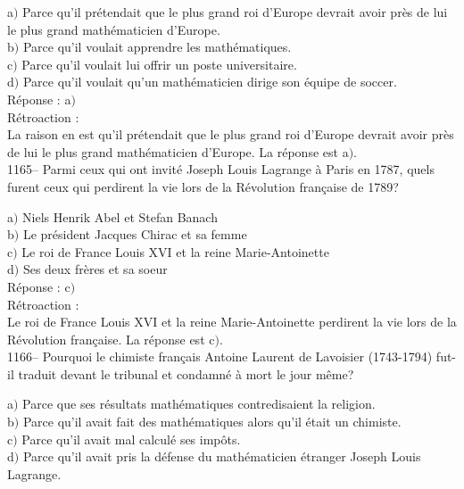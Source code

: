 ﻿\documentclass[letterpaper, 12pt]{article}
\begin{document}
a$)$ Parce qu'il pr\'etendait que \og le plus grand roi d'Europe
devrait avoir pr\`es de lui le plus grand math\'ematicien d'Europe\fg . \\
b$)$ Parce qu'il voulait apprendre les math\'ematiques. \\
c$)$ Parce qu'il voulait lui offrir un poste universitaire. \\
d$)$ Parce qu'il voulait qu'un math\'ematicien dirige son \'equipe de
soccer. \\

R\'eponse : a$)$\\

R\'etroaction : \\
La raison en est qu'il pr\'etendait que \og le plus grand roi
d'Europe devrait avoir pr\`es de lui le plus grand math\'ematicien
d'Europe\fg .
La r\'eponse est a$)$.\\

1165-- Parmi ceux qui ont invit\'e Joseph Louis Lagrange \`a Paris
en 1787, quels furent ceux qui perdirent la vie lors de la
R\'evolution fran\c caise de 1789?

a$)$ Niels Henrik Abel et Stefan Banach \\
b$)$ Le pr\'esident Jacques Chirac et sa femme \\
c$)$ Le roi de France Louis XVI et la reine Marie-Antoinette \\
d$)$ Ses deux fr\`eres et sa soeur \\

R\'eponse : c$)$\\

R\'etroaction : \\
Le roi de France Louis XVI et la reine Marie-Antoinette perdirent la vie
lors de la R\'evolution fran\c caise.
La r\'eponse est c$)$.\\

1166-- Pourquoi le chimiste fran\c cais Antoine Laurent de Lavoisier
(1743-1794) fut-il traduit devant le tribunal et condamn\'e \`a mort
le jour m\^eme?

a$)$ Parce que ses r\'esultats math\'ematiques contredisaient la religion.
\\
b$)$ Parce qu'il avait fait des math\'ematiques alors qu'il \'etait un
chimiste. \\
c$)$ Parce qu'il avait mal calcul\'e ses imp\^ots. \\
d$)$ Parce qu'il avait pris la d\'efense du math\'ematicien \'etranger
Joseph Louis Lagrange.\\
\end{document}
